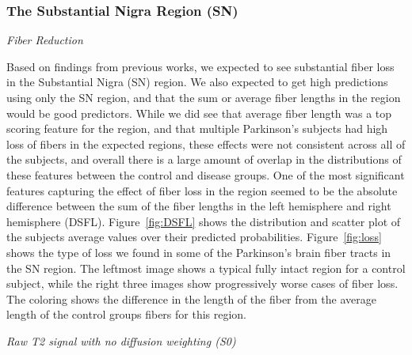 \subsubsection{The Substantial Nigra Region (SN)}

\textsl{Fiber Reduction}

Based on findings from previous works, we expected to see substantial fiber loss in the Substantial Nigra (SN) region. We also expected to get high predictions using only the SN region, and that the sum or average fiber lengths in the region would be good predictors. While we did see that average fiber length was a top scoring feature for the region, and that multiple Parkinson's subjects had high loss of fibers in the expected regions, these effects were not consistent across all of the subjects, and overall there is a large amount of overlap in the distributions of these features between the control and disease groups. One of the most significant features capturing the effect of fiber loss in the region seemed to be the absolute difference between the sum of the fiber lengths in the left hemisphere and right hemisphere (DSFL). Figure~\ref{fig:DSFL} shows the distribution and scatter plot of the subjects average values over their predicted probabilities. Figure~\ref{fig:loss} shows the type of loss we found in some of the Parkinson's brain fiber tracts in the SN region. The leftmost image shows a typical fully intact region for a control subject, while the right three images show progressively worse cases of fiber loss. The coloring shows the difference in the length of the fiber from the average length of the control groups fibers for this region.

\textsl{ Raw T2 signal with no diffusion weighting (S0) } 

